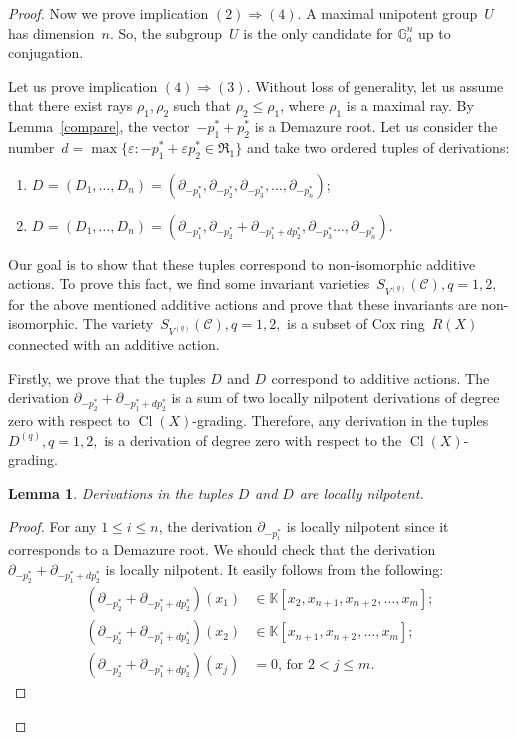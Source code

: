 \documentclass[a4paper,reqno,12pt]{amsart}
\DeclareMathOperator {\Cl}{Cl}
\DeclareMathOperator {\NNA}{(2)}
\DeclareMathOperator {\NA}{(1)}
\def\Ga  {\mathbb G_a}
\def\K  {\mathbb K}
\def\epsilon{\varepsilon}
\newtheorem{lmm}{Lemma}
\theoremstyle{definition}
\begin{document}
\begin{proof}
  Now we prove  implication $(2) \Rightarrow (4)$.
  A maximal unipotent group~$U$ has dimension~$n$.
  So, the subgroup~$U$ is the only candidate for $\Ga^n$ up to conjugation.

  \smallskip
  
  Let us prove  implication $(4) \Rightarrow (3)$.
  Without loss of generality, let us assume that there exist  rays $\rho_1, \rho_2$ such that $\rho_2 \leq \rho_1$, where $\rho_1$ is a maximal ray.
  By Lemma~\ref{compare}, the vector~$-p_1^*+p_2^*$ is a Demazure root.
  Let us consider the number~${d=\max\{\epsilon : -p_1^*+\epsilon p_2^* \in \mathfrak R_1\}}$
  and take two ordered tuples of derivations:
  \begin{enumerate}
  \item[] $D^{\NA}=(D^{\NA}_1, \ldots, D^{\NA}_n) = (\partial_{-p_1^*}, \partial_{-p_2^*}, \partial_{-p_3^*},\ldots, \partial_{-p_n^*})$;
  \item[] $D^{\NNA}=(D^{\NNA}_1, \ldots, D^{\NNA}_n) =(\partial_{-p_1^*}, \partial_{-p_2^*}+\partial_{-p_1^*+dp_2^*}, \partial_{-p_3^*}\ldots, \partial_{-p_n^*})$.
  \end{enumerate}

  Our goal is to show that these tuples correspond to non-isomorphic additive actions.
  To prove this fact, we find some invariant varieties~$S_{V^{(q)}}(\mathcal C), q=1,2,$ for the above mentioned additive actions and prove that these invariants are non-isomorphic.
  The variety~$S_{V^{(q)}}(\mathcal C), q=1,2,$ is a subset of Cox ring~$R(X)$  connected with an additive action.

  \smallskip
  
  Firstly, we prove that the tuples $D^{\NA}$ and $D^{\NNA}$ correspond to additive actions.
  The derivation $\partial_{-p_2^*}+\partial_{-p_1^*+dp_2^*}$ is a sum of two locally nilpotent derivations of degree zero with respect to $\Cl(X)$-grading.
  Therefore, any derivation in the tuples $D^{(q)}, q=1,2,$ is a derivation of degree zero with respect to the $\Cl(X)$-grading.
  \begin{lmm}
    Derivations in the tuples $D^{\NA}$ and $D^{\NNA}$ are locally nilpotent.
  \end{lmm}
  \begin{proof}
    For any $1 \leq i \leq n$, the derivation $\partial_{-p_i^*}$ is locally nilpotent since it corresponds to a Demazure root.
    We should check that the derivation $\partial_{-p_2^*}+\partial_{-p_1^*+dp_2^*}$ is locally nilpotent.
    It easily follows from the following:
    \begin{align*}
        (\partial_{-p_2^*}+\partial_{-p_1^*+dp_2^*})(x_1)&\in \K[x_2, x_{n+1}, x_{n+2}, \ldots, x_m];\\
        (\partial_{-p_2^*}+\partial_{-p_1^*+dp_2^*})(x_2)&\in \K[x_{n+1}, x_{n+2}, \ldots, x_m];\\
      (\partial_{-p_2^*}+\partial_{-p_1^*+dp_2^*})(x_j)&=0 \text{, for } 2 < j \leq m.  
    \end{align*}


\end{proof}
\end{proof}
\end{document}
